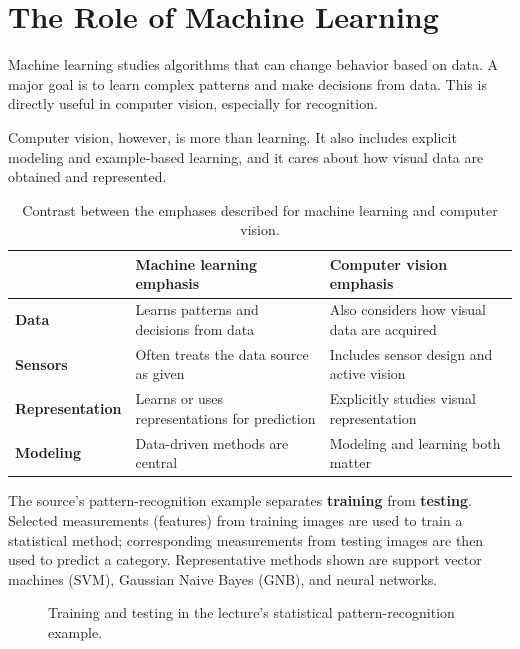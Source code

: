 \documentclass[11pt,a4paper,oneside]{report}
\begin{document}
\section{The Role of Machine Learning}

Machine learning studies algorithms that can change behavior based on data. A major goal is to learn complex patterns and make decisions from data. This is directly useful in computer vision, especially for recognition.

Computer vision, however, is more than learning. It also includes explicit modeling and example-based learning, and it cares about how visual data are obtained and represented.

\begin{table}[!htbp]
\centering
\caption{Contrast between the emphases described for machine learning and computer vision.}
\label{tab:cv-ml}
\begin{tabularx}{\textwidth}{>{\sffamily\bfseries}p{}Y Y}
\toprule
{}
 & \textbf{Machine learning emphasis} & \textbf{Computer vision emphasis} \\
\midrule
Data & Learns patterns and decisions from data & Also considers how visual data are acquired \\
Sensors & Often treats the data source as given & Includes sensor design and active vision \\
Representation & Learns or uses representations for prediction & Explicitly studies visual representation \\
Modeling & Data-driven methods are central & Modeling and learning both matter \\
\bottomrule
\end{tabularx}
\end{table}


The source's pattern-recognition example separates \textbf{training} from \textbf{testing}. Selected measurements (features) from training images are used to train a statistical method; corresponding measurements from testing images are then used to predict a category. Representative methods shown are support vector machines (SVM), Gaussian Naive Bayes (GNB), and neural networks.
\begin{figure}[!htbp]
\centering
{}
\caption{Training and testing in the lecture's statistical pattern-recognition example.}
\label{fig:pattern-recognition}
\end{figure}
\end{document}
